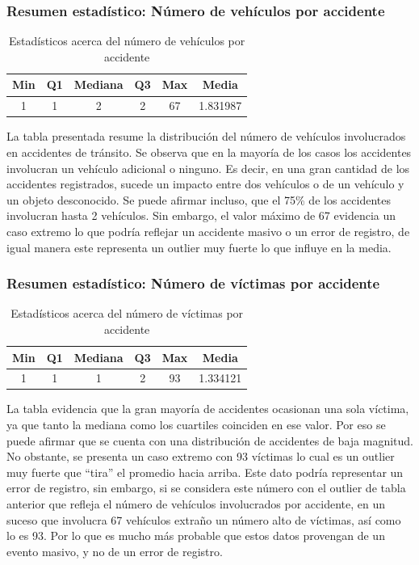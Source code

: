 \documentclass[12pt]{article}
\begin{document}
\subsubsection*{Resumen estadístico: Número de vehículos por accidente}
\begin{table}[h]
\centering
\begin{tabular}{cccccc}
\hline
Min                    & Q1 & Mediana & Q3 & Max & Media    \\ \hline
\multicolumn{1}{|c}{1} & 1  & 2       & 2  & 67  & 1.831987 \\ \hline
\end{tabular}
\caption{Estadísticos acerca del número de vehículos por accidente}
\label{tab:num_vehiculos}
\end{table}

La tabla presentada resume la distribución del número de vehículos involucrados 
en accidentes de tránsito. Se observa que en la mayoría de los casos los accidentes involucran 
un vehículo adicional o ninguno. Es decir, en una gran cantidad de los accidentes 
registrados, sucede un impacto entre dos vehículos o de un vehículo y un objeto 
desconocido. Se puede afirmar incluso, que el 75\% de los accidentes involucran 
hasta 2 vehículos. Sin embargo, el valor máximo de 67 evidencia un caso extremo 
lo que podría reflejar un accidente masivo o un error de registro, de igual manera 
este representa un outlier muy fuerte lo que influye en la media. 


\subsubsection*{Resumen estadístico: Número de víctimas por accidente}
\begin{table}[h]
\centering 
\begin{tabular}{cccccc}
\hline
Min                    & Q1 & Mediana & Q3 & Max & Media    \\ \hline
\multicolumn{1}{|c}{1} & 1  & 1       & 2  & 93  & 1.334121 \\ \hline
\end{tabular}
\caption{Estadísticos acerca del número de víctimas por accidente}
\label{tab:num_victimas}
\end{table}

La tabla evidencia que la gran mayoría de accidentes ocasionan una sola víctima, 
ya que tanto la mediana como los cuartiles coinciden en ese valor. Por eso se 
puede afirmar que se cuenta con una distribución de accidentes de baja magnitud.
No obstante, se presenta un caso extremo con 93 víctimas lo cual es un outlier 
muy fuerte que “tira” el promedio hacia arriba. Este dato podría representar un
error de registro, sin embargo, si se considera este número con el outlier de 
tabla anterior que refleja el número de vehículos involucrados por accidente, 
en un suceso que involucra 67 vehículos extraño un número alto de víctimas, así 
como lo es 93. Por lo que es mucho más probable que estos datos provengan de un 
evento masivo, y no de un error de registro.  
\end{document}
